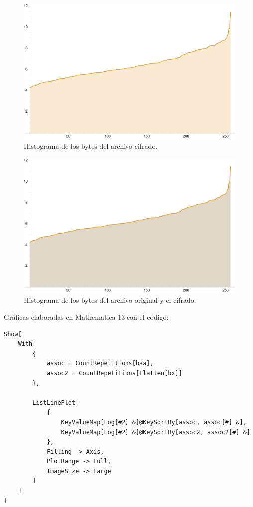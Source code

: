 \documentclass[a4paper]{article}
\begin{document}
\begin{figure}[H]
    \centering
    \includegraphics[scale=0.7]{historygramorig2}
    \caption*{Histograma de los bytes del archivo cifrado.}
    \label{fig:d3}
\end{figure}

\begin{figure}[H]
    \centering
    \includegraphics[scale=0.7]{historygram}
    \caption*{Histograma de los bytes del archivo
original y el cifrado.}\label{fig:d2}
\end{figure}

Gráficas elaboradas en Mathematica 13 con el código:

\begin{verbatim}
Show[
    With[
        {
            assoc = CountRepetitions[baa],
            assoc2 = CountRepetitions[Flatten[bx]]
        },

        ListLinePlot[
            {
                KeyValueMap[Log[#2] &]@KeySortBy[assoc, assoc[#] &],
                KeyValueMap[Log[#2] &]@KeySortBy[assoc2, assoc2[#] &]
            },
            Filling -> Axis,
            PlotRange -> Full,
            ImageSize -> Large
        ]
    ]
]
\end{verbatim}
\end{document}

